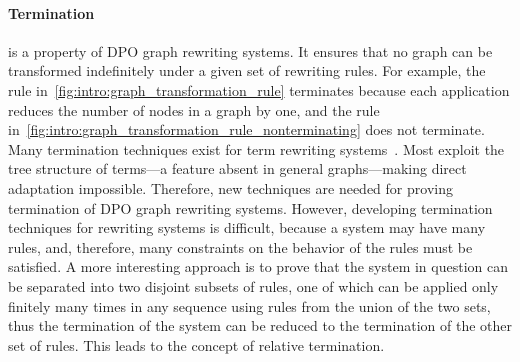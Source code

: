 \paragraph{Termination} is a property of DPO graph rewriting systems. It ensures that no graph can be transformed indefinitely under a given set of rewriting rules. For example, the rule in~\autoref{fig:intro:graph_transformation_rule} terminates because each application reduces the number of nodes in a graph by one, and the rule in~\autoref{fig:intro:graph_transformation_rule_nonterminating} does not terminate.
Many termination techniques exist for term rewriting systems~\cite{nipkow1998term, dershowitz1982orderings, middeldorp1997simple, arts2000termination}.  
Most exploit the tree structure of terms—a feature absent in general graphs—making direct adaptation impossible. 
Therefore, new techniques are needed for proving termination of DPO graph rewriting systems. However, developing termination techniques for rewriting systems is difficult, because a system may have many rules, and, therefore, many constraints on the behavior of the rules must be satisfied. A more interesting approach is to prove that the system in question can be separated into two disjoint subsets of rules, one of which can be applied only finitely many times in any sequence using rules from the union of the two sets, thus the termination of the system can be reduced to the termination of the other set of rules. This leads to the concept of relative termination.

